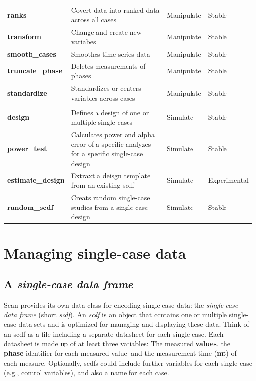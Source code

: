 \documentclass[
]{book}
\begin{document}
\begin{table}
\begin{tabular}[t]{>{\raggedright\arraybackslash}p{15em}>{\raggedright\arraybackslash}p{30em}ll}
\textbf{ranks} & Covert data into ranked data across all cases & Manipulate & Stable\\
\textbf{transform} & Change and create new variabes & Manipulate & Stable\\
\textbf{smooth\_cases} & Smoothes time series data & Manipulate & Stable\\
\textbf{truncate\_phase} & Deletes measurements of phases & Manipulate & Stable\\
\textbf{standardize} & Standardizes or centers variables across cases & Manipulate & Stable\\
\textbf{} &  &  & \\
\textbf{design} & Defines a design of one or multiple single-cases & Simulate & Stable\\
\textbf{power\_test} & Calculates power and alpha error of a specific analyzes for a specific single-case design & Simulate & Stable\\
\textbf{estimate\_design} & Extraxt a deisgn template from an existing scdf & Simulate & Experimental\\
\textbf{random\_scdf} & Creats random single-case studies from a single-case design & Simulate & Stable\\
\bottomrule
\end{tabular}
\end{table}

\hypertarget{managing-single-case-data}{%
\chapter{Managing single-case data}\label{managing-single-case-data}}

\hypertarget{a-single-case-data-frame}{%
\section{\texorpdfstring{A \textbf{\emph{single-case data frame}}}{A single-case data frame}}\label{a-single-case-data-frame}}

Scan provides its own data-class for encoding single-case data: the \emph{single-case data frame} (short \emph{scdf}). An \emph{scdf} is an object that contains one or multiple single-case data sets and is optimized for managing and displaying these data. Think of an scdf as a file including a separate datasheet for each single case. Each datasheet is made up of at least three variables: The measured \textbf{values}, the \textbf{phase} identifier for each measured value, and the measurement time (\textbf{mt}) of each measure. Optionally, scdfs could include further variables for each single-case (e.g., control variables), and also a name for each case.
\end{document}
